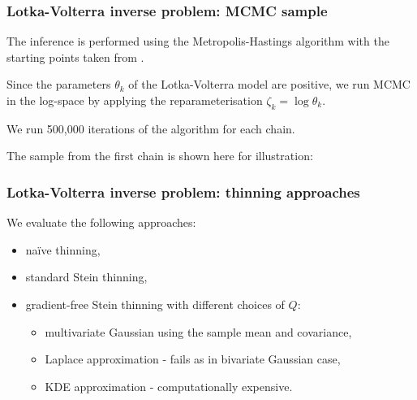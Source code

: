 \documentclass{beamer}
\begin{document}
\begin{frame}
\frametitle{Lotka-Volterra inverse problem: MCMC sample}

The inference is performed using the Metropolis-Hastings algorithm with the starting points taken from \cite{riabizOptimalThinningMCMC2022}.

Since the parameters $\theta_k$ of the Lotka-Volterra model are positive, we run MCMC in the log-space by applying the reparameterisation $\zeta_k = \log \theta_k$. 

We run 500,000 iterations of the algorithm for each chain.


The sample from the first chain is shown here for illustration:

\begin{figure}[h]
\centering
{}
\end{figure}

\end{frame}



\begin{frame}
\frametitle{Lotka-Volterra inverse problem: thinning approaches}

We evaluate the following approaches:
\begin{itemize}
\item na\"ive thinning,
\item standard Stein thinning,
\item gradient-free Stein thinning with different choices of $Q$:
	\begin{itemize}
	\item multivariate Gaussian using the sample mean and covariance,
	\item Laplace approximation - \alert{fails as in bivariate Gaussian case},
	\item KDE approximation - \alert{computationally expensive}.
	\end{itemize}
\end{itemize}

\end{frame}
\end{document}
